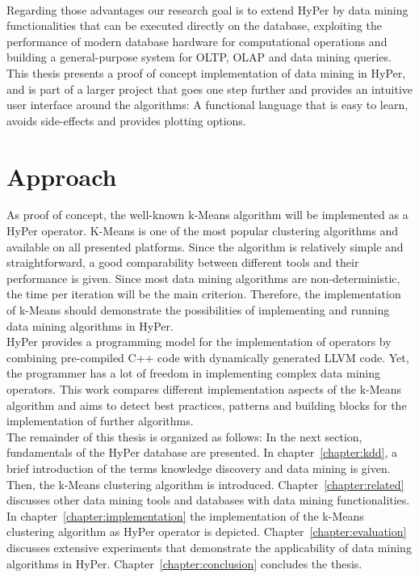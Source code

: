 \\
Regarding those advantages our research goal is to extend HyPer by data mining functionalities that can be executed directly on the database, exploiting the performance of modern database hardware for computational operations and building a general-purpose system for OLTP, OLAP and data mining queries. This thesis presents a proof of concept implementation of data mining in HyPer, and is part of a larger project that goes one step further and provides an intuitive user interface around the algorithms: A functional language that is easy to learn, avoids side-effects and provides plotting options. 


\section{Approach}
As proof of concept, the well-known k-Means algorithm will be implemented as a HyPer operator. K-Means is one of the most popular  clustering algorithms and available on all presented platforms. Since the algorithm is relatively simple and straightforward, a good comparability between different tools and their performance is given. Since most data mining algorithms are non-deterministic, the time per iteration will be the main criterion. Therefore, the implementation of k-Means should demonstrate the possibilities of implementing and running data mining algorithms in HyPer.
\\
HyPer provides a programming model for the implementation of operators by combining pre-compiled C++ code with dynamically generated LLVM code. Yet, the programmer has a lot of freedom in implementing complex data mining operators. This work compares different implementation aspects of the k-Means algorithm and aims to detect best practices, patterns and building blocks for the implementation of further algorithms.
\\
The remainder of this thesis is organized as follows: In the next section, fundamentals of the HyPer database are presented. In chapter~\ref{chapter:kdd}, a brief introduction of the terms knowledge discovery and data mining is given. Then, the k-Means clustering algorithm is introduced. Chapter~\ref{chapter:related} discusses other data mining tools and databases with data mining functionalities. In chapter~\ref{chapter:implementation} the implementation of the k-Means clustering algorithm as HyPer operator is depicted. Chapter~\ref{chapter:evaluation} discusses extensive experiments that demonstrate the applicability of data mining algorithms in HyPer. Chapter~\ref{chapter:conclusion} concludes the thesis.



